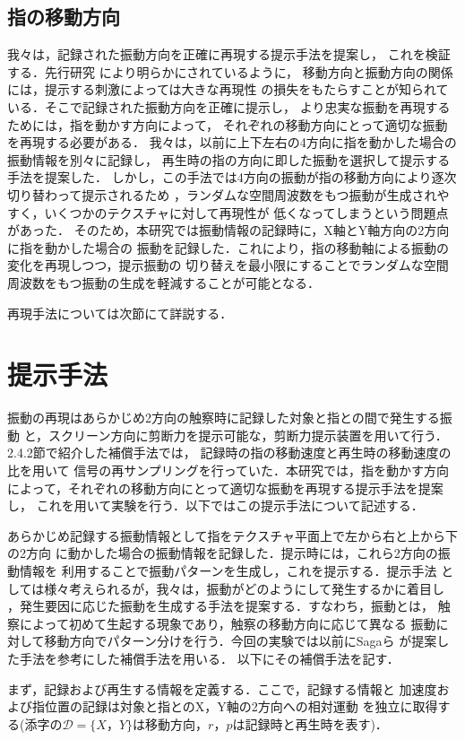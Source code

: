 \subsection{指の移動方向}
我々は，記録された振動方向を正確に再現する提示手法を提案し，
これを検証する．先行研究\cite{saga2013simultaneous}
により明らかにされているように，
移動方向と振動方向の関係には，提示する刺激によっては大きな再現性
の損失をもたらすことが知られている．そこで記録された振動方向を正確に提示し，
より忠実な振動を再現するためには，指を動かす方向によって，
それぞれの移動方向にとって適切な振動を再現する必要がある．
我々は，以前に上下左右の4方向に指を動かした場合の振動情報を別々に記録し，
再生時の指の方向に即した振動を選択して提示する手法を提案した．
しかし，この手法では4方向の振動が指の移動方向により逐次切り替わって提示されるため
，ランダムな空間周波数をもつ振動が生成されやすく，いくつかのテクスチャに対して再現性が
低くなってしまうという問題点があった．
そのため，本研究では振動情報の記録時に，X軸とY軸方向の2方向に指を動かした場合の
振動を記録した．これにより，指の移動軸による振動の変化を再現しつつ，提示振動の
切り替えを最小限にすることでランダムな空間周波数をもつ振動の生成を軽減することが可能となる．

再現手法については次節にて詳説する．


\section{提示手法}
振動の再現はあらかじめ2方向の触察時に記録した対象と指との間で発生する振動
と，スクリーン方向に剪断力を提示可能な，剪断力提示装置を用いて行う．
2.4.2節で紹介した補償手法では，
記録時の指の移動速度と再生時の移動速度の比を用いて
信号の再サンプリングを行っていた．本研究では，指を動かす方向
によって，それぞれの移動方向にとって適切な振動を再現する提示手法を提案し，
これを用いて実験を行う．以下ではこの提示手法について記述する．\par
あらかじめ記録する振動情報として指をテクスチャ平面上で左から右と上から下の2方向
に動かした場合の振動情報を記録した．提示時には，これら2方向の振動情報を
利用することで振動パターンを生成し，これを提示する．提示手法
としては様々考えられるが，我々は，振動がどのようにして発生するかに着目し
，発生要因に応じた振動を生成する手法を提案する．すなわち，振動とは，
触察によって初めて生起する現象であり，触察の移動方向に応じて異なる
振動に対して移動方向でパターン分けを行う．今回の実験では以前にSagaら\cite{saga2013simultaneous}
が提案した手法を参考にした補償手法を用いる．
以下にその補償手法を記す．\par
まず，記録および再生する情報を定義する．ここで，記録する情報と
加速度および指位置の記録は対象と指とのX，Y軸の2方向への相対運動
を独立に取得する(添字の$\mathcal{D} = \{X，Y
\}$は移動方向，$r， p$は記録時と再生時を表す)．


